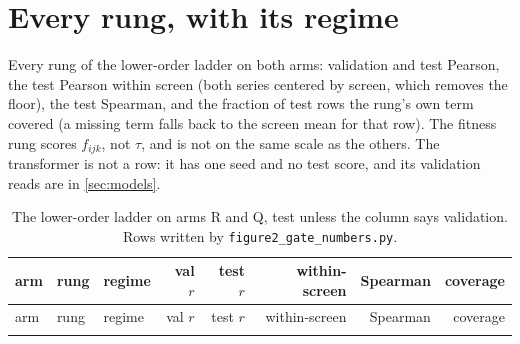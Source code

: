 
\clearpage
\section{Every rung, with its regime}
\label{sec:performance}

Every rung of the lower-order ladder on both arms: validation and test Pearson, the test
Pearson within screen (both series centered by screen, which removes the floor), the test
Spearman, and the fraction of test rows the rung's own term covered (a missing term falls
back to the screen mean for that row). The fitness rung scores $f_{ijk}$, not $\tau$, and
is not on the same scale as the others. The transformer is not a row: it has one seed and
no test score, and its validation reads are in \ref{sec:models}.

{\scriptsize
\setlength{\tabcolsep}{3pt}
\begin{longtable}{@{}l>{\raggedright\arraybackslash}p{46mm}>{\raggedright\arraybackslash}p{22mm}rrrrr@{}}
  \caption[]{The lower-order ladder on arms R and Q, test unless the column says
  validation. Rows written by \texttt{figure2\_gate\_numbers.py}.}
  \label{tab:performance}\\
  \toprule
  arm & rung & regime & val $r$ & test $r$ & within-screen & Spearman & coverage \\
  \midrule
  \endfirsthead
  \toprule
  arm & rung & regime & val $r$ & test $r$ & within-screen & Spearman & coverage \\
  \midrule
  \endhead
  \bottomrule
  \endlastfoot
  
\end{longtable}}
